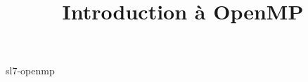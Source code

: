 \documentclass {beamer}
\title {Introduction à OpenMP}
\begin{document}
 {sl7-openmp}
\end{document}
